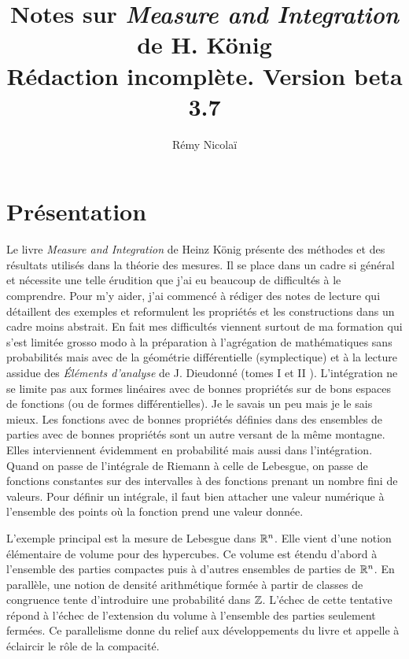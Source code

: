 
\nocite{*}

\title{
         Notes sur \emph{Measure and Integration} de H. König \\
         \large Rédaction incomplète. Version  beta 3.7
      }
\author{Rémy Nicolaï}


\maketitle
\tableofcontents
\clearpage

\chapter{Présentation}
\noindent Le livre \emph{Measure and Integration} de Heinz König \cite{könig1997measure} présente des méthodes et des résultats utilisés dans la théorie des mesures. Il se place dans un cadre si général et nécessite une telle érudition que j'ai eu beaucoup de difficultés à le comprendre. Pour m'y aider, j'ai commencé à rédiger des notes de lecture qui détaillent des exemples et reformulent les propriétés et les constructions dans un cadre moins abstrait.\newline
En fait mes difficultés viennent surtout de ma formation qui s'est limitée grosso modo à la préparation à l'agrégation de mathématiques sans probabilités mais avec de la géométrie différentielle (symplectique) et à la lecture assidue des \emph{Éléments d'analyse} de J. Dieudonné (tomes I \cite{dieudonne1969elements} et II \cite{dieudonne1969elements2}).\newline
L'intégration ne se limite pas aux formes linéaires avec de bonnes propriétés sur de bons espaces de fonctions (ou de formes différentielles). Je le savais un peu mais je le sais mieux. Les fonctions avec de bonnes propriétés définies dans des ensembles de parties avec de bonnes propriétés sont un autre versant de la même montagne. Elles interviennent évidemment en probabilité mais aussi dans l'intégration.\newline
Quand on passe de l'intégrale de Riemann à celle de Lebesgue, on passe de fonctions constantes sur des intervalles à des fonctions prenant un nombre fini de valeurs. Pour définir un intégrale, il faut bien attacher une valeur numérique à l'ensemble des points où la fonction prend une valeur donnée.


L'exemple principal est la mesure de Lebesgue dans $\mathbb{R}^n$. Elle vient d'une notion élémentaire de volume pour des hypercubes. Ce volume est étendu d'abord à l'ensemble des parties compactes puis à d'autres ensembles de parties de $\mathbb{R}^n$.\newline
En parallèle, une notion de densité arithmétique formée à partir de classes de congruence tente d'introduire une probabilité dans $\mathbb{Z}$. L'échec de cette tentative répond à l'échec de l'extension du volume à l'ensemble des parties seulement fermées. Ce parallelisme donne du relief aux développements du livre et appelle à éclaircir le rôle de la compacité.

